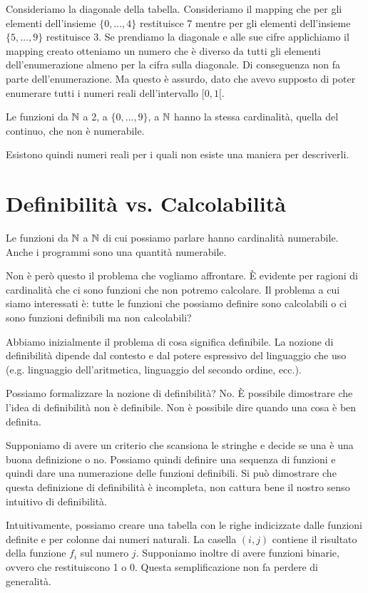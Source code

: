 Consideriamo la diagonale della tabella. Consideriamo il mapping che per gli elementi dell'insieme
$\{0,\dotsc,4\}$ restituisce 7 mentre per gli elementi dell'insieme $\{5,\dotsc,9\}$ restituisce 3.
Se prendiamo la diagonale e alle sue cifre applichiamo il mapping creato otteniamo un numero che è
diverso da tutti gli elementi dell'enumerazione almeno per la cifra sulla diagonale. Di conseguenza
non fa parte dell'enumerazione. Ma questo è assurdo, dato che avevo supposto di poter enumerare
tutti i numeri reali dell'intervallo $[0,1[$.

Le funzioni da $\mathbb{N}$ a 2, a $\{0,\dotsc,9\}$, a $\mathbb{N}$ hanno la stessa cardinalità, quella del
continuo, che non è numerabile.

Esistono quindi numeri reali per i quali non esiste una maniera per descriverli.

\section{Definibilità vs. Calcolabilità}

Le funzioni da $\mathbb{N}$ a $\mathbb{N}$ di cui possiamo parlare hanno cardinalità numerabile. Anche i programmi sono
una quantità numerabile.

Non è però questo il problema che vogliamo affrontare. È evidente per ragioni di cardinalità che
ci sono funzioni che non potremo calcolare. Il problema a cui siamo interessati è: tutte le
funzioni che possiamo definire sono calcolabili o ci sono funzioni definibili ma non calcolabili?

Abbiamo inizialmente il problema di cosa significa definibile. La nozione di definibilità dipende
dal contesto e dal potere espressivo del linguaggio che uso (e.g. linguaggio dell'aritmetica, linguaggio
del secondo ordine, ecc.).

Possiamo formalizzare la nozione di definibilità? No. È possibile dimostrare che l'idea di
definibilità non è definibile. Non è possibile dire quando una cosa è ben definita.

Supponiamo di avere un criterio che scansiona le stringhe e decide se una è una buona definizione o
no. Possiamo quindi definire una sequenza di funzioni e quindi dare una numerazione delle funzioni
definibili. Si può dimostrare che questa definizione di definibilità è incompleta, non cattura
bene il nostro senso intuitivo di definibilità. 

Intuitivamente, possiamo creare una tabella con le righe indicizzate dalle funzioni definite e per
colonne dai numeri naturali. La casella $(i,j)$ contiene il risultato della funzione $f_i$ sul
numero $j$. Supponiamo inoltre di avere funzioni binarie, ovvero che restituiscono 1 o 0. Questa
semplificazione non fa perdere di generalità. 


